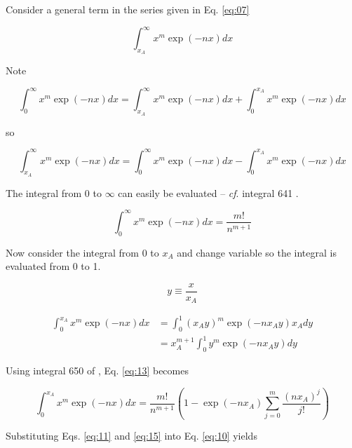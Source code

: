 \documentclass[letterpaper,12pt]{article}
\begin{document}
Consider a general term in the series given in Eq. \ref{eq:07}

\begin{equation} \label{eq:08}
\int_{x_{A}}^{\infty} x^{m} \exp(-nx) dx
\end{equation}

\noindent Note

\begin{equation} \label{eq:09}
\int_{0}^{\infty} x^{m} \exp(-nx) dx = \int_{x_{A}}^{\infty} x^{m} \exp(-nx) dx + \int_{0}^{x_{A}} x^{m} \exp(-nx) dx
\end{equation}

\noindent so

\begin{equation} \label{eq:10}
\int_{x_{A}}^{\infty} x^{m} \exp(-nx) dx = \int_{0}^{\infty} x^{m} \exp(-nx) dx - \int_{0}^{x_{A}} x^{m} \exp(-nx) dx
\end{equation}

\noindent The integral from 0 to $\infty$ can easily be evaluated -- \emph{cf}. integral 641 \cite{9780849324796}.

\begin{equation} \label{eq:11}
\int_{0}^{\infty} x^{m} \exp(-nx) dx = \frac{m!}{n^{m+1}}
\end{equation}

Now consider the integral from 0 to $x_{A}$ and change variable so the integral is evaluated from 0 to 1.

\begin{equation} \label{eq:12}
y \equiv \frac{x}{x_{A}}
\end{equation}

\begin{align} \label{eq:13}
\int_{0}^{x_{A}} x^{m} \exp(-nx) dx &= \int_{0}^{1} (x_{A}y)^{m} \exp(-nx_{A}y) x_{A} dy \nonumber \\
 &= x_{A}^{m+1} \int_{0}^{1} y^{m} \exp(-nx_{A}y) dy
\end{align}

\noindent Using integral 650 of \cite{9780849324796}, Eq. \ref{eq:13} becomes

\begin{equation} \label{eq:15}
\int_{0}^{x_{A}} x^{m} \exp(-nx) dx = \frac{m!}{n^{m+1}} \left(1 - \exp(-n x_{A}) \sum_{j = 0}^{m} \frac{(n x_{A})^{j}}{j!} \right) 
\end{equation}

Substituting Eqs. \ref{eq:11} and \ref{eq:15} into Eq. \ref{eq:10} yields
\end{document}
